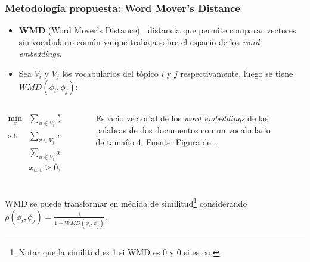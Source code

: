 \documentclass[
	spanish, %
	aspectratio=43, %
	hyperref={pdfencoding=auto,psdextra},
	xcolor={dvipsnames,table,usenames},
]{beamer}
\begin{document}
\begin{frame}[t]
\frametitle{Metodología propuesta: Word Mover's Distance}

\begin{itemize}
  \item \textbf{WMD} (Word Mover's Distance) \cite{kusner2015word}: distancia que permite comparar vectores sin vocabulario común ya que trabaja sobre el espacio de los \textit{word embeddings}. 
  \item Sea  $V_{i}$ y $V_{j}$ los vocabularios del tópico $i$ y $j$ respectivamente, luego se tiene $WMD(\phi_{i}, \phi_{j})$:
\end{itemize}

\vspace*{-0.4in}
\begin{columns}
\begin{column}{0.4\textwidth}

\begin{align}
\underset{x}{\text{min}}&\sum_{u \in V_{i}}\sum_{v \in V_{j}} c_{u,v}x_{u,v} \\ 
\textrm{s.t.} &\sum_{v \in V_{j}}x_{u,v}= \phi_{i,u}, \; u \in V_{i}\\ 
& \sum_{u \in V_{i}}x_{u,v}= \phi_{j,v}, \; v\in V_{j}\\
& x_{u,v} \geq 0,\; u \in V_{i} \;, v \in V_{j}\\ \nonumber
\end{align}

\end{column}

\begin{column}{0.6\textwidth}
\begin{figure}
\caption{Espacio vectorial de los \textit{word embeddings} de las palabras de dos documentos con un vocabulario de tamaño 4. Fuente: Figura de \cite{WMDPy}.}
\label{img:wmd_obama}
\end{figure}
\end{column}

\end{columns}

WMD se puede transformar en médida de similitud\footnote{Notar que la similitud es 1 si WMD es 0 y 0 si es $\infty$.} considerando $\rho(\phi_{i}, \phi_{j}) = \frac{1}{1+WMD(\phi_{i}, \phi_{j})}$.

\end{frame}
\end{document}
